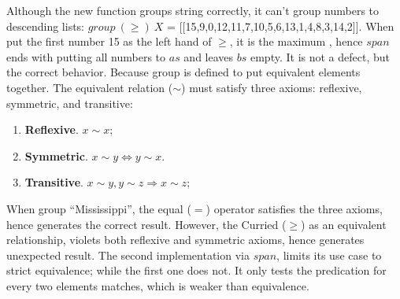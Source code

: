 \documentclass[b5paper]{article}
\begin{document}
Although the new function groups string correctly, it can't group numbers to descending lists: $\textit{group}\ (\geq)\ X$ = [[15,9,0,12,11,7,10,5,6,13,1,4,8,3,14,2]]. When put the first number 15 as the left hand of $\geq$, it is the maximum , hence $span$ ends with putting all numbers to $as$ and leaves $bs$ empty. It is not a defect, but the correct behavior. Because group is defined to put equivalent elements together. The equivalent relation ($\sim$) must satisfy three axioms: reflexive, symmetric, and transitive:

\begin{enumerate}
\item \textbf{Reflexive}. $x \sim x$;
\item \textbf{Symmetric}. $x \sim y \Leftrightarrow y \sim x$.
\item \textbf{Transitive}. $x \sim y, y \sim z \Rightarrow x \sim z$;
\end{enumerate}

When group ``Mississippi'', the equal ($=$) operator satisfies the three axioms, hence generates the correct result. However, the Curried ($\geq$) as an equivalent relationship, violets both reflexive and symmetric axioms, hence generates unexpected result. The second implementation via $span$, limits its use case to strict equivalence; while the first one does not. It only tests the predication for every two elements matches, which is weaker than equivalence.

\begin{Exercise}\label{ex:list-take-drop}
\end{Exercise}
\end{document}
